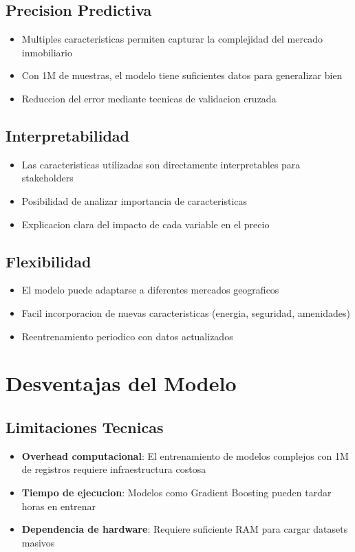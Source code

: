 \documentclass[12pt,a4paper]{article}
\begin{document}
\subsection{Precision Predictiva}
\begin{itemize}
    \item Multiples caracteristicas permiten capturar la complejidad del mercado inmobiliario
    \item Con 1M de muestras, el modelo tiene suficientes datos para generalizar bien
    \item Reduccion del error mediante tecnicas de validacion cruzada
\end{itemize}

\subsection{Interpretabilidad}
\begin{itemize}
    \item Las caracteristicas utilizadas son directamente interpretables para stakeholders
    \item Posibilidad de analizar importancia de caracteristicas
    \item Explicacion clara del impacto de cada variable en el precio
\end{itemize}

\subsection{Flexibilidad}
\begin{itemize}
    \item El modelo puede adaptarse a diferentes mercados geograficos
    \item Facil incorporacion de nuevas caracteristicas (energia, seguridad, amenidades)
    \item Reentrenamiento periodico con datos actualizados
\end{itemize}

\section{Desventajas del Modelo}

\subsection{Limitaciones Tecnicas}
\begin{itemize}
    \item \textbf{Overhead computacional}: El entrenamiento de modelos complejos con 1M de registros requiere infraestructura costosa
    \item \textbf{Tiempo de ejecucion}: Modelos como Gradient Boosting pueden tardar horas en entrenar
    \item \textbf{Dependencia de hardware}: Requiere suficiente RAM para cargar datasets masivos
\end{itemize}
\end{document}
